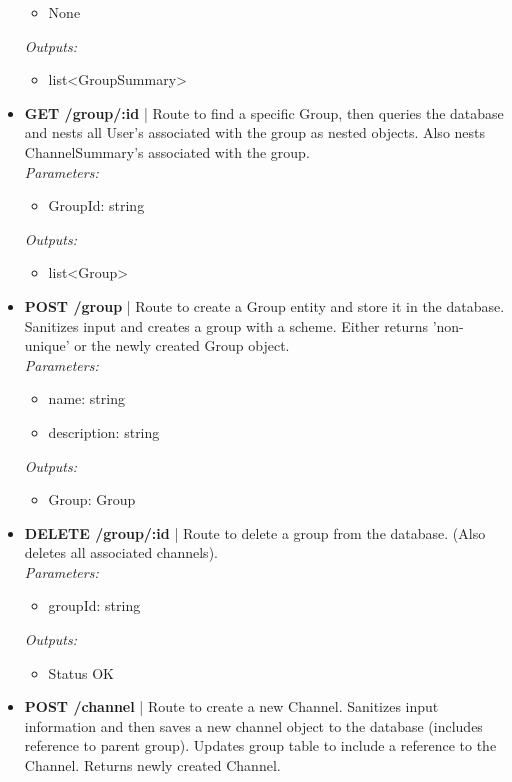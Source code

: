\documentclass[11pt, conference,letterpaper]{IEEEtran}
\begin{document}
\begin{itemize}
\begin{itemize}
            \item None
        \end{itemize}
        \textit{Outputs: }
        \begin{itemize}
            \item list<GroupSummary>
        \end{itemize}
    \item \textbf{GET /group/:id} | Route to find a specific Group, then queries the database and nests all User's associated with the group as nested objects. Also nests ChannelSummary's associated with the group.
        \\ \textit{Parameters: }
        \begin{itemize}
            \item GroupId: string
        \end{itemize}
        \textit{Outputs: }
        \begin{itemize}
            \item list<Group>
        \end{itemize}
    \item \textbf{POST /group} | Route to create a Group entity and store it in the database. Sanitizes input and creates a group with a scheme. Either returns 'non-unique' or the newly created Group object.
        \\ \textit{Parameters: }
        \begin{itemize}
            \item name: string
            \item description: string
        \end{itemize}
        \textit{Outputs: }
        \begin{itemize}
            \item Group: Group
        \end{itemize}
    \item \textbf{DELETE /group/:id} | Route to delete a group from the database. (Also deletes all associated channels).
        \\ \textit{Parameters: }
        \begin{itemize}
            \item groupId: string
        \end{itemize}
        \textit{Outputs: }
        \begin{itemize}
            \item Status OK
        \end{itemize}
    \item \textbf{POST /channel} | Route to create a new Channel. Sanitizes input information and then saves a new channel object to the database (includes reference to parent group). Updates group table to include a reference to the Channel. Returns newly created Channel.

\end{itemize}
\end{document}
